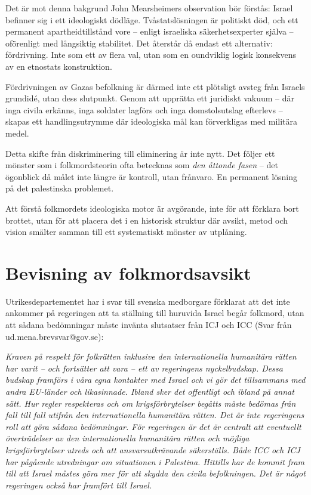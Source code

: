 \documentclass[12pt]{article}
\begin{document}
Det är mot denna bakgrund John Mearsheimers observation bör förstås: Israel befinner sig i ett ideologiskt dödläge. Tvåstatslösningen är politiskt död, och ett permanent apartheidtillstånd vore – enligt israeliska säkerhetsexperter själva – oförenligt med långsiktig stabilitet. Det återstår då endast ett alternativ: fördrivning. Inte som ett av flera val, utan som en oundviklig logisk konsekvens av en etnostats konstruktion.

Fördrivningen av Gazas befolkning är därmed inte ett plötsligt avsteg från Israels grundidé, utan dess slutpunkt. Genom att upprätta ett juridiskt vakuum – där inga civila erkänns, inga soldater lagförs och inga domstolsutslag efterlevs – skapas ett handlingsutrymme där ideologiska mål kan förverkligas med militära medel.

Detta skifte från diskriminering till eliminering är inte nytt. Det följer ett mönster som i folkmordsteorin ofta betecknas som \textit{den åttonde fasen} – det ögonblick då målet inte längre är kontroll, utan frånvaro. En permanent lösning på det palestinska problemet.

Att förstå folkmordets ideologiska motor är avgörande, inte för att förklara bort brottet, utan för att placera det i en historisk struktur där avsikt, metod och vision smälter samman till ett systematiskt mönster av utplåning.

\section{Bevisning av folkmordsavsikt}


Utrikesdepartementet har i svar till svenska medborgare förklarat att det inte ankommer på regeringen att ta ställning till huruvida Israel begår folkmord, utan att sådana bedömningar måste invänta slutsatser från ICJ och ICC (Svar från ud.mena.brevsvar@gov.se):

\textit{Kraven på respekt för folkrätten inklusive den internationella humanitära rätten har varit – och fortsätter att vara – ett av regeringens nyckelbudskap. Dessa budskap framförs i våra egna kontakter med Israel och vi gör det tillsammans med andra EU-länder och likasinnade. Ibland sker det offentligt och ibland på annat sätt. Hur regler respekteras och om krigsförbrytelser begåtts måste bedömas från fall till fall utifrån den internationella humanitära rätten. Det är inte regeringens roll att göra sådana bedömningar. För regeringen är det är centralt att eventuellt överträdelser av den internationella humanitära rätten och möjliga krigsförbrytelser utreds och att ansvarsutkrävande säkerställs. Både ICC och ICJ har pågående utredningar om situationen i Palestina. Hittills har de kommit fram till att Israel måstes göra mer för att skydda den civila befolkningen. Det är något regeringen också har framfört till Israel.}
\end{document}
